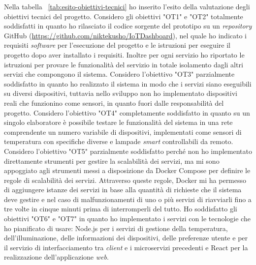 Nella tabella ~\ref{tab:esito-obiettivi-tecnici} ho inserito l'esito della valutazione degli obiettivi tecnici del progetto.
Considero gli obiettivi "OT1" e "OT2" totalmente soddisfatti in quanto ho rilasciato il codice sorgente del prototipo su un \emph{repository} GitHub (\url{https://github.com/niktekusho/IoTDashboard}), nel quale ho indicato i requisiti \emph{software} per l'esecuzione del progetto e le istruzioni per eseguire il progetto dopo aver installato i requisiti. Inoltre per ogni servizio ho riportato le istruzioni per provare le funzionalità del servizio in totale isolamento dagli altri servizi che compongono il sistema.
Considero l'obiettivo "OT3" parzialmente soddisfatto in quanto ho realizzato il sistema in modo che i servizi siano eseguibili su diversi dispositivi, tuttavia nello sviluppo non ho implementato dispositivi reali che funzionino come sensori, in quanto fuori dalle responsabilità del progetto.
Considero l'obiettivo "OT4" completamente soddisfatto in quanto su un singolo elaboratore è possibile testare le funzionalità del sistema in una rete comprendente un numero variabile di dispositivi, implementati come sensori di temperatura con specifiche diverse e lampade \emph{smart} controllabili da remoto.
Considero l'obiettivo "OT5" parzialmente soddisfatto perché non ho implementato direttamente strumenti per gestire la scalabilità dei servizi, ma mi sono appoggiato agli strumenti messi a disposizione da Docker Compose per definire le regole di scalabilità dei servizi. Attraverso queste regole, Docker mi ha permesso di aggiungere istanze dei servizi in base alla quantità di richieste che il sistema deve gestire e nel caso di malfunzionamenti di uno o più servizi di riavviarli fino a tre volte in cinque minuti prima di interromperli del tutto.
Ho soddisfatto gli obiettivi "OT6" e "OT7" in quanto ho implementato i servizi con le tecnologie che ho pianificato di usare: Node.js per i servizi di gestione della temperatura, dell'illuminazione, delle informazioni dei dispositivi, delle preferenze utente e per il servizio di interfacciamento tra \emph{client} e i microservizi precedenti e React per la realizzazione dell'applicazione \emph{web}.

